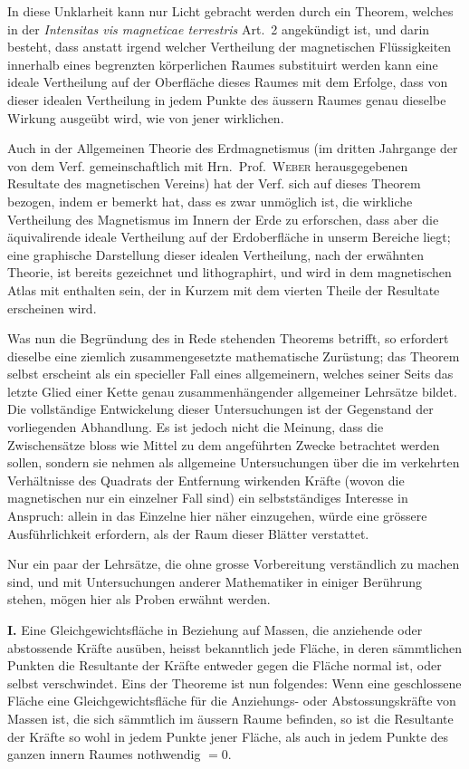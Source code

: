 \documentclass[12pt,a4paper]{article}
\begin{document}
In diese Unklarheit kann nur Licht gebracht werden durch ein Theorem, welches in der \textit{Intensitas vis magneticae terrestris} Art.~2 angekündigt ist, und darin besteht, dass anstatt irgend welcher Vertheilung der magnetischen Flüssigkeiten innerhalb eines begrenzten körperlichen Raumes substituirt werden kann eine ideale Vertheilung auf der Oberfläche dieses Raumes mit dem Erfolge, dass von dieser idealen Vertheilung in jedem Punkte des äussern Raumes genau dieselbe Wirkung ausgeübt wird, wie von jener wirklichen.

Auch in der Allgemeinen Theorie des Erdmagnetismus (im dritten Jahrgange der von dem Verf. gemeinschaftlich mit Hrn.~Prof.~\textsc{Weber} herausgegebenen Resultate des magnetischen Vereins) hat der Verf. sich auf dieses Theorem bezogen, indem er bemerkt hat, dass es zwar unmöglich ist, die wirkliche Vertheilung des Magnetismus im Innern der Erde zu erforschen, dass aber die äquivalirende ideale Vertheilung auf der Erdoberfläche in unserm Bereiche liegt; eine graphische Darstellung dieser idealen Vertheilung, nach der erwähnten Theorie, ist bereits gezeichnet und lithographirt, und wird in dem magnetischen Atlas mit enthalten sein, der in Kurzem mit dem vierten Theile der Resultate erscheinen wird.

Was nun die Begründung des in Rede stehenden Theorems betrifft, so erfordert dieselbe eine ziemlich zusammengesetzte mathematische Zurüstung; das Theorem selbst erscheint als ein specieller Fall eines allgemeinern, welches seiner Seits das letzte Glied einer Kette genau zusammenhängender allgemeiner Lehrsätze bildet. Die vollständige Entwickelung dieser Untersuchungen ist der Gegenstand der vorliegenden Abhandlung. Es ist jedoch nicht die Meinung, dass die Zwischensätze bloss wie Mittel zu dem angeführten Zwecke betrachtet werden sollen, sondern sie nehmen als allgemeine Untersuchungen über die im verkehrten Verhältnisse des Quadrats der Entfernung wirkenden Kräfte (wovon die magnetischen nur ein einzelner Fall sind) ein selbstständiges Interesse in Anspruch: allein in das Einzelne hier näher einzugehen, würde eine grössere Ausführlichkeit erfordern, als der Raum dieser Blätter verstattet.

Nur ein paar der Lehrsätze, die ohne grosse Vorbereitung verständlich zu machen sind, und mit Untersuchungen anderer Mathematiker in einiger Berührung stehen, mögen hier als Proben erwähnt werden.

\bigskip

\textbf{I.} Eine Gleichgewichtsfläche in Beziehung auf Massen, die anziehende oder abstossende Kräfte ausüben, heisst bekanntlich jede Fläche, in deren sämmtlichen Punkten die Resultante der Kräfte entweder gegen die Fläche normal ist, oder selbst verschwindet. Eins der Theoreme ist nun folgendes: Wenn eine geschlossene Fläche eine Gleichgewichtsfläche für die Anziehungs- oder Abstossungskräfte von Massen ist, die sich sämmtlich im äussern Raume befinden, so ist die Resultante der Kräfte so wohl in jedem Punkte jener Fläche, als auch in jedem Punkte des ganzen innern Raumes nothwendig $= 0$.
\end{document}
